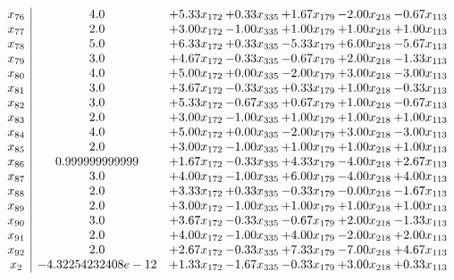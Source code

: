 \documentclass[8pt]{article}
\begin{document}
\[\begin{array}{c| c c@{\hskip 2pt} c@{\hskip 2pt} c@{\hskip 2pt} c@{\hskip 2pt} c@{\hskip 2pt} }
 x_{76}   &  4.0 & +  5.33 x_{172} & +  0.33 x_{335} & +  1.67 x_{179} & -2.00 x_{218} & -0.67 x_{113}\\
 x_{77}   &  2.0 & +  3.00 x_{172} & -1.00 x_{335} & +  1.00 x_{179} & +  1.00 x_{218} & +  1.00 x_{113}\\
 x_{78}   &  5.0 & +  6.33 x_{172} & +  0.33 x_{335} & -5.33 x_{179} & +  6.00 x_{218} & -5.67 x_{113}\\
 x_{79}   &  3.0 & +  4.67 x_{172} & -0.33 x_{335} & -0.67 x_{179} & +  2.00 x_{218} & -1.33 x_{113}\\
 x_{80}   &  4.0 & +  5.00 x_{172} & +  0.00 x_{335} & -2.00 x_{179} & +  3.00 x_{218} & -3.00 x_{113}\\
 x_{81}   &  3.0 & +  3.67 x_{172} & -0.33 x_{335} & +  0.33 x_{179} & +  1.00 x_{218} & -0.33 x_{113}\\
 x_{82}   &  3.0 & +  5.33 x_{172} & -0.67 x_{335} & +  0.67 x_{179} & +  1.00 x_{218} & -0.67 x_{113}\\
 x_{83}   &  2.0 & +  3.00 x_{172} & -1.00 x_{335} & +  1.00 x_{179} & +  1.00 x_{218} & +  1.00 x_{113}\\
 x_{84}   &  4.0 & +  5.00 x_{172} & +  0.00 x_{335} & -2.00 x_{179} & +  3.00 x_{218} & -3.00 x_{113}\\
 x_{85}   &  2.0 & +  3.00 x_{172} & -1.00 x_{335} & +  1.00 x_{179} & +  1.00 x_{218} & +  1.00 x_{113}\\
 x_{86}   &  0.999999999999 & +  1.67 x_{172} & -0.33 x_{335} & +  4.33 x_{179} & -4.00 x_{218} & +  2.67 x_{113}\\
 x_{87}   &  3.0 & +  4.00 x_{172} & -1.00 x_{335} & +  6.00 x_{179} & -4.00 x_{218} & +  4.00 x_{113}\\
 x_{88}   &  2.0 & +  3.33 x_{172} & +  0.33 x_{335} & -0.33 x_{179} & -0.00 x_{218} & -1.67 x_{113}\\
 x_{89}   &  2.0 & +  3.00 x_{172} & -1.00 x_{335} & +  1.00 x_{179} & +  1.00 x_{218} & +  1.00 x_{113}\\
 x_{90}   &  3.0 & +  3.67 x_{172} & -0.33 x_{335} & -0.67 x_{179} & +  2.00 x_{218} & -1.33 x_{113}\\
 x_{91}   &  2.0 & +  4.00 x_{172} & -1.00 x_{335} & +  4.00 x_{179} & -2.00 x_{218} & +  2.00 x_{113}\\
 x_{92}   &  2.0 & +  2.67 x_{172} & -0.33 x_{335} & +  7.33 x_{179} & -7.00 x_{218} & +  4.67 x_{113}\\
 x_{2}   &  -4.32254232408e-12 & +  1.33 x_{172} & -1.67 x_{335} & -0.33 x_{179} & +  3.00 x_{218} & +  0.33 x_{113}\\

\end{array}\]
\end{document}
